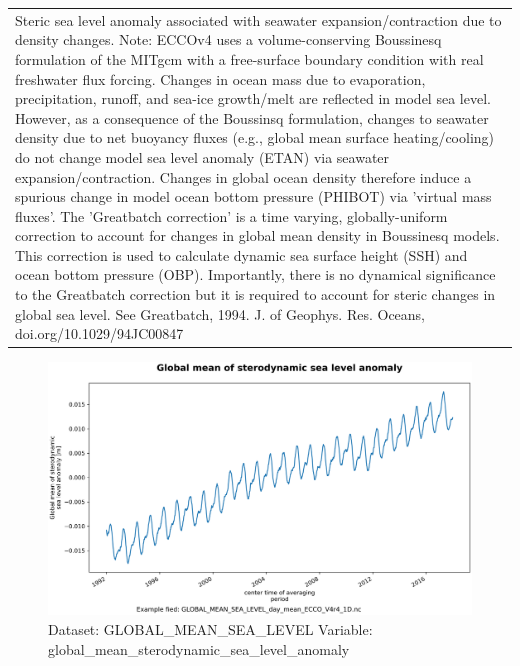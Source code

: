 \begin{longtable}{|p{}|p{}|p{}|p{}|}
\rowcolor{lightgray} \multicolumn{4}{|p{1.00\textwidth}|}{\textbf{Comments}} \\ \hline
\multicolumn{4}{|p{1\textwidth}|}{Steric sea level anomaly associated with seawater expansion/contraction due to density changes. Note: ECCOv4 uses a volume-conserving Boussinesq formulation of the MITgcm with a free-surface boundary condition with real freshwater flux forcing. Changes in ocean mass due to evaporation, precipitation, runoff, and sea-ice growth/melt are reflected in model sea level. However, as a consequence of the Boussinsq formulation, changes to seawater density due to net buoyancy fluxes (e.g., global mean surface heating/cooling) do not change model sea level anomaly (ETAN) via seawater expansion/contraction. Changes in global ocean density therefore induce a spurious change in model ocean bottom pressure (PHIBOT) via 'virtual mass fluxes'. The 'Greatbatch correction' is a time varying, globally-uniform correction to account for changes in global mean density in Boussinesq models. This correction is used to calculate dynamic sea surface height (SSH) and ocean bottom pressure (OBP). Importantly, there is no dynamical significance to the Greatbatch correction but it is required to account for steric changes in global sea level. See Greatbatch, 1994. J. of Geophys. Res. Oceans, doi.org/10.1029/94JC00847} \\ \hline
\end{longtable}

\begin{figure}[H]
\centering
\includegraphics[width=\textwidth]{../images/plots/oneD_plots/Global_Mean_Sea_Level/global_mean_sterodynamic_sea_level_anomaly.png}
\caption{Dataset: GLOBAL\_MEAN\_SEA\_LEVEL Variable: global\_mean\_sterodynamic\_sea\_level\_anomaly}
\label{tab:table-GLOBAL_MEAN_SEA_LEVEL_global_mean_sterodynamic_sea_level_anomaly-Plot}
\end{figure}
\pagebreak
